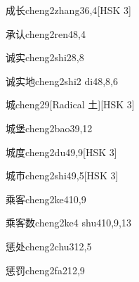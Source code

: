 \begin{entry}{成长}{cheng2zhang3}{6,4}[HSK 3]
\end{entry}

\begin{entry}{承认}{cheng2ren4}{8,4}
\end{entry}

\begin{entry}{诚实}{cheng2shi2}{8,8}
\end{entry}

\begin{entry}{诚实地}{cheng2shi2 di4}{8,8,6}
\end{entry}

\begin{entry}{城}{cheng2}{9}[Radical 土][HSK 3]
\end{entry}

\begin{entry}{城堡}{cheng2bao3}{9,12}
\end{entry}

\begin{entry}{城度}{cheng2du4}{9,9}[HSK 3]
\end{entry}

\begin{entry}{城市}{cheng2shi4}{9,5}[HSK 3]
\end{entry}

\begin{entry}{乘客}{cheng2ke4}{10,9}
\end{entry}

\begin{entry}{乘客数}{cheng2ke4 shu4}{10,9,13}
\end{entry}

\begin{entry}{惩处}{cheng2chu3}{12,5}
\end{entry}

\begin{entry}{惩罚}{cheng2fa2}{12,9}
\end{entry}

